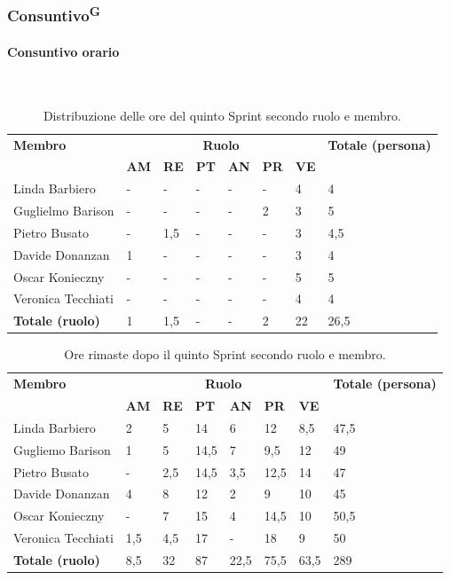 \documentclass[8pt]{article}
\newcommand{\glossterm}[1]{#1\textsuperscript{G}} %
\newcommand{\subsubsubsection}[1]{\paragraph{#1}\mbox{}\\}
\begin{document}
\subsubsection{\glossterm{Consuntivo}}
\subsubsubsection{Consuntivo orario}
\begin{table}[ht!]
	\centering
	\begin{tabular}{p{4cm} p{1cm} p{1cm} p{1cm} p{1cm} p{1cm} p{1cm} p{3cm}}
		\toprule
        \textbf{Membro} & \multicolumn{6}{c}{\textbf{Ruolo}} & \textbf{Totale (persona)}\\
		& \textbf{AM} & \textbf{RE} & \textbf{PT} & \textbf{AN} & \textbf{PR} & \textbf{VE}\\
		\midrule
        Linda Barbiero          & -     & -     & -     & -     & -     & 4     & 4 \\
        Guglielmo Barison       & -     & -     & -     & -     & 2     & 3     & 5\\
        Pietro Busato           & -     & 1,5   & -     & -     & -     & 3     & 4,5 \\
        Davide Donanzan         & 1     & -     & -     & -     & -     & 3     & 4 \\
        Oscar Konieczny         & -     & -     & -     & -     & -     & 5     & 5 \\
        Veronica Tecchiati      & -     & -     & -     & -     & -     & 4     & 4 \\
        \midrule
        \textbf{Totale (ruolo)} & 1     & 1,5   & -    & -      & 2  & 22   & 26,5 \\
		\bottomrule
	\end{tabular}
	\caption{Distribuzione delle ore del quinto Sprint secondo ruolo e membro.}
	\label{table:Distribuzione delle ore del quinto Sprint secondo ruolo e membr}
\end{table}
\begin{table}[ht!]
	\centering
	\begin{tabular}{p{4cm} p{1cm} p{1cm} p{1cm} p{1cm} p{1cm} p{1cm} p{3cm}}
		\toprule
        \textbf{Membro} & \multicolumn{6}{c}{\textbf{Ruolo}} & \textbf{Totale (persona)}\\
		& \textbf{AM} & \textbf{RE} & \textbf{PT} & \textbf{AN} & \textbf{PR} & \textbf{VE}\\
		\midrule
        Linda Barbiero & 2 & 5 & 14 & 6 & 12 & 8,5 & 47,5 \\ 
        Gugliemo Barison & 1 & 5 & 14,5 & 7 & 9,5 & 12 & 49 \\ 
        Pietro Busato & - & 2,5 & 14,5 & 3,5 & 12,5 & 14 & 47 \\ 
        Davide Donanzan & 4 & 8 & 12 & 2 & 9 & 10 & 45 \\ 
        Oscar Konieczny & - & 7 & 15 & 4 & 14,5 & 10 & 50,5 \\ 
        Veronica Tecchiati & 1,5 & 4,5 & 17 & - & 18 & 9 & 50 \\ 
        \midrule
        \textbf{Totale (ruolo)} & 8,5 & 32 & 87 & 22,5 & 75,5 & 63,5 & 289 \\ 
        \bottomrule
	\end{tabular}
	\caption{Ore rimaste dopo il quinto Sprint secondo ruolo e membro.}
	\label{table:Ore rimaste dopo il quinto Sprint secondo ruolo e membro.}
\end{table}
\end{document}

